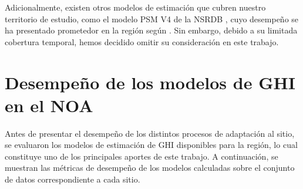 \documentclass[letterpaper,12pt, twoside]{report}
\providecommand{\DIFdeltex}[1]{{\protect\color{red} \scriptsize #1}} %
\providecommand{\DIFdel}[1]{\texorpdfstring{\DIFdeltex{#1}}{}} %
\begin{document}
\DIFdel{Adicionalmente, existen otros modelos de estimación que cubren nuestro territorio de estudio, como el modelo PSM V4 de la NSRDB \citep{Sengupta2014}, cuyo desempeño 	se ha presentado prometedor en la región según \citep{Salazar2024,Ledesma2025}. Sin embargo, debido a su limitada cobertura temporal, hemos decidido omitir su consideración en este trabajo.}%

\section{\DIFdel{Desempeño de los modelos de GHI en el NOA}}
\addtocounter{section}{-1}%

\DIFdel{Antes de presentar el desempeño de los distintos procesos de adaptación al sitio, se evaluaron los modelos de estimación de GHI disponibles para la región, lo cual constituye uno de los principales aportes de este trabajo. A continuación, se muestran las métricas de desempeño de los modelos calculadas sobre el conjunto de datos correspondiente a cada sitio.
}%

\end{document}
